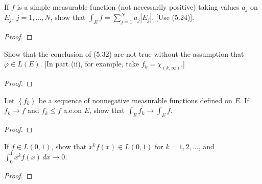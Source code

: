 \begin{problem}
If $f$ is a simple measurable function (not necessarily positive) taking
values $a_j$ on $E_j$, $j=1,...,N$, show that $\int_E f=\sum_{j=1}^N
a_j\left|E_j\right|$. [Use (5.24)].
\end{problem}
\begin{proof}
\end{proof}
\newpage

\begin{problem}
Show that the conclusion of (5.32) are not true without the assumption that
$\varphi\in L(E)$. [In part (ii), for example, take $f_k=\chi_{(k,\infty)}$.]
\end{problem}
\begin{proof}
\end{proof}
\newpage

\begin{problem}
Let $\left\{f_k\right\}$ be a sequence of nonnegative measurable functions
defined on $E$. If $f_k\to f$ and $f_k\leq f$ a.e.\@ on $E$, show that
$\int_E f_k\to\int_E f$.
\end{problem}
\begin{proof}
\end{proof}
\newpage

\begin{problem}
If $f\in L(0,1)$, show that $x^kf(x)\in L(0,1)$ for $k=1,2,...$, and
$\int_0^1 x^kf(x)\,dx\to 0$.
\end{problem}
\begin{proof}
\end{proof}

